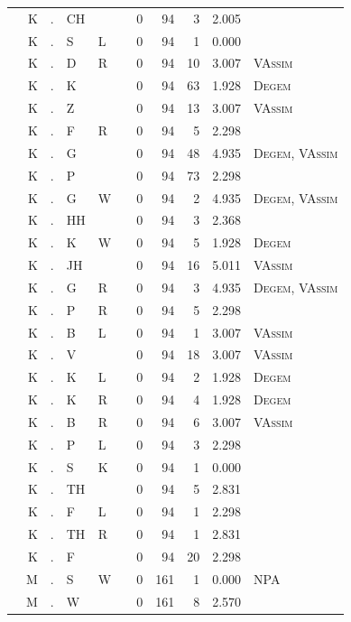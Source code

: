 \documentclass[12pt]{article}
\begin{document}
\begin{longtable}{r@{ } r@{ } c@{ } l@{ } l@{ } l@{ } r r r r l }
 & K & . & CH &  &  & 0 & 94 & 3 & 2.005 &  \\
 & K & . & S & L &  & 0 & 94 & 1 & 0.000 &  \\
 & K & . & D & R &  & 0 & 94 & 10 & 3.007 & \textsc{VAssim} \\
 & K & . & K &  &  & 0 & 94 & 63 & 1.928 & \textsc{Degem} \\
 & K & . & Z &  &  & 0 & 94 & 13 & 3.007 & \textsc{VAssim} \\
 & K & . & F & R &  & 0 & 94 & 5 & 2.298 &  \\
 & K & . & G &  &  & 0 & 94 & 48 & 4.935 & \textsc{Degem}, \textsc{VAssim} \\
 & K & . & P &  &  & 0 & 94 & 73 & 2.298 &  \\
 & K & . & G & W &  & 0 & 94 & 2 & 4.935 & \textsc{Degem}, \textsc{VAssim} \\
 & K & . & HH &  &  & 0 & 94 & 3 & 2.368 &  \\
 & K & . & K & W &  & 0 & 94 & 5 & 1.928 & \textsc{Degem} \\
 & K & . & JH &  &  & 0 & 94 & 16 & 5.011 & \textsc{VAssim} \\
 & K & . & G & R &  & 0 & 94 & 3 & 4.935 & \textsc{Degem}, \textsc{VAssim} \\
 & K & . & P & R &  & 0 & 94 & 5 & 2.298 &  \\
 & K & . & B & L &  & 0 & 94 & 1 & 3.007 & \textsc{VAssim} \\
 & K & . & V &  &  & 0 & 94 & 18 & 3.007 & \textsc{VAssim} \\
 & K & . & K & L &  & 0 & 94 & 2 & 1.928 & \textsc{Degem} \\
 & K & . & K & R &  & 0 & 94 & 4 & 1.928 & \textsc{Degem} \\
 & K & . & B & R &  & 0 & 94 & 6 & 3.007 & \textsc{VAssim} \\
 & K & . & P & L &  & 0 & 94 & 3 & 2.298 &  \\
 & K & . & S & K &  & 0 & 94 & 1 & 0.000 &  \\
 & K & . & TH &  &  & 0 & 94 & 5 & 2.831 &  \\
 & K & . & F & L &  & 0 & 94 & 1 & 2.298 &  \\
 & K & . & TH & R &  & 0 & 94 & 1 & 2.831 &  \\
 & K & . & F &  &  & 0 & 94 & 20 & 2.298 &  \\
 & M & . & S & W &  & 0 & 161 & 1 & 0.000 & \textsc{NPA} \\
 & M & . & W &  &  & 0 & 161 & 8 & 2.570 &  \\

\end{longtable}
\end{document}
